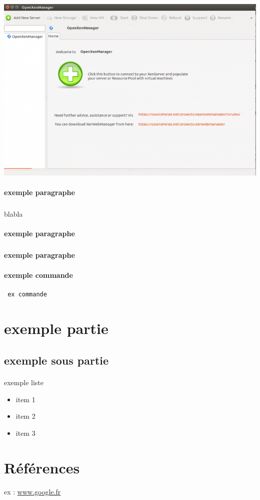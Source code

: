 \documentclass[a4paper,12pt]{article}
\begin{document}
\begin{center}
\includegraphics[scale=0.70]{openxenmanager}
\end{center}

\paragraph{exemple paragraphe}
\subparagraph{}
blabla

\paragraph{exemple paragraphe}
\subparagraph{}

\paragraph{exemple paragraphe}
\paragraph{}

\paragraph{exemple commande}
\begin{verbatim}
 ex commande
\end{verbatim}

\clearpage
\section{exemple partie}
\subsection{exemple sous partie}
\paragraph{}

exemple liste
\begin{itemize}
\item item 1
\item item 2 
\item item 3
\end{itemize}


\clearpage
\section{Références}

ex :
\url{www.google.fr}\
\end{document}
